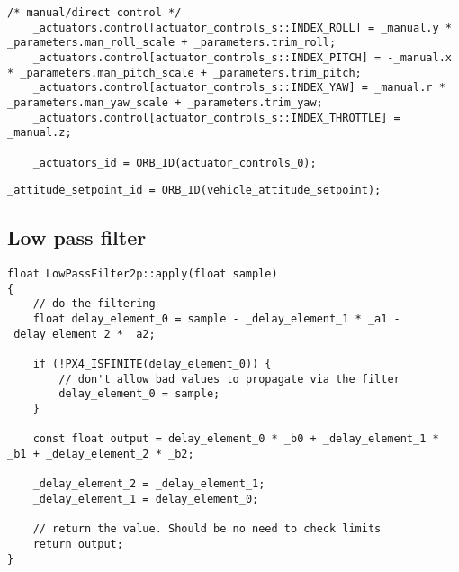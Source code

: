 \begin{lstlisting}[title=处理逻辑3]  	
    /* manual/direct control */
    _actuators.control[actuator_controls_s::INDEX_ROLL] = _manual.y * _parameters.man_roll_scale + _parameters.trim_roll;
    _actuators.control[actuator_controls_s::INDEX_PITCH] = -_manual.x * _parameters.man_pitch_scale + _parameters.trim_pitch;
    _actuators.control[actuator_controls_s::INDEX_YAW] = _manual.r * _parameters.man_yaw_scale + _parameters.trim_yaw;
    _actuators.control[actuator_controls_s::INDEX_THROTTLE] = _manual.z;

    _actuators_id = ORB_ID(actuator_controls_0);
\end{lstlisting}

\begin{lstlisting}[title=$\_attitude\_setpoint\_id$]
_attitude_setpoint_id = ORB_ID(vehicle_attitude_setpoint);
\end{lstlisting}

\subsection{Low pass filter}
\begin{lstlisting}[title=Low pass filter from px4]
    float LowPassFilter2p::apply(float sample)
{
	// do the filtering
	float delay_element_0 = sample - _delay_element_1 * _a1 - _delay_element_2 * _a2;

	if (!PX4_ISFINITE(delay_element_0)) {
		// don't allow bad values to propagate via the filter
		delay_element_0 = sample;
	}

	const float output = delay_element_0 * _b0 + _delay_element_1 * _b1 + _delay_element_2 * _b2;

	_delay_element_2 = _delay_element_1;
	_delay_element_1 = delay_element_0;

	// return the value. Should be no need to check limits
	return output;
}
\end{lstlisting}
    